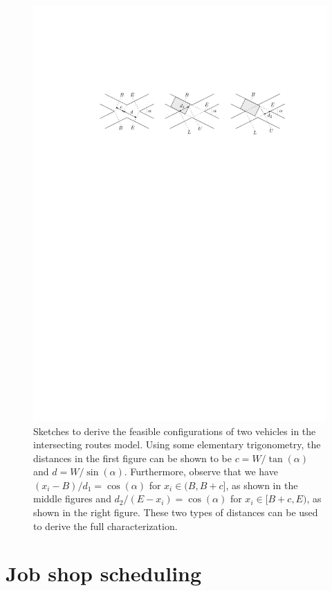 \documentclass[a4paper]{report}
\theoremstyle{definition}
\theoremstyle{plain}
\newcommand\halfopen[2]{\ensuremath{[#1,#2)}}
\newcommand\openhalf[2]{\ensuremath{(#1,#2]}}
\begin{document}
\begin{figure}
  \centering
  \includegraphics[scale=1]{figures/configuration-space}
  \caption{Sketches to derive the feasible configurations of two vehicles in the
    intersecting routes model. Using some elementary trigonometry, the distances
    in the first figure can be shown to be $c = W / \tan(\alpha)$ and
    $d = W / \sin(\alpha)$. Furthermore, observe that we have
    $(x_{i} - B) / d_{1} = \cos(\alpha)$ for
    $x_{i} \in \openhalf{B}{B + c}$, as shown in the middle figures and
    $d_{2}/(E - x_{i}) = \cos(\alpha)$ for $x_{i} \in \halfopen{B + c}{E}$,
    as shown in the right figure. These two types of distances can be used to
    derive the full characterization.}
  \label{fig:configuration-space}
\end{figure}


\chapter{Job shop scheduling}\label{app:job-shop}
\end{document}
